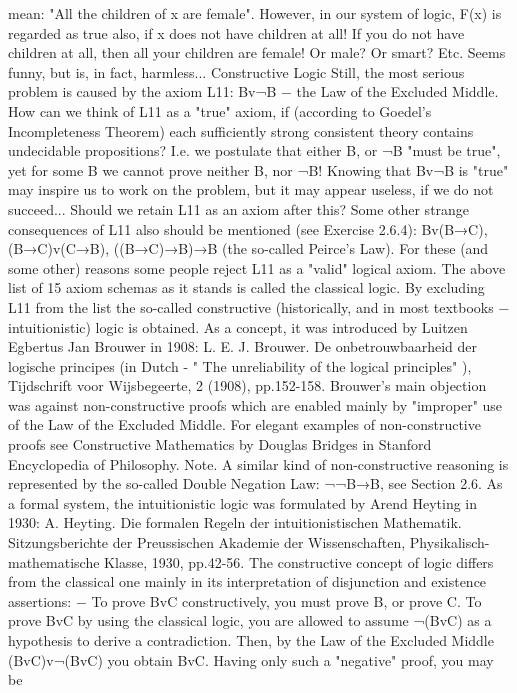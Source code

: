 mean: "All the children of x are female". However, in our system of logic, F(x) is regarded as true also, if
x does not have children at all! If you do not have children at all, then all your children are female! Or
male? Or smart? Etc. Seems funny, but is, in fact, harmless...
Constructive Logic
Still, the most serious problem is caused by the axiom L11: Bv¬B − the Law of the Excluded Middle.
How can we think of L11 as a "true" axiom, if (according to Goedel's Incompleteness Theorem) each
sufficiently strong consistent theory contains undecidable propositions? I.e. we postulate that either B, or
¬B "must be true", yet for some B we cannot prove neither B, nor ¬B! Knowing that Bv¬B is "true" may
inspire us to work on the problem, but it may appear useless, if we do not succeed... Should we retain L11
as an axiom after this?
Some other strange consequences of L11 also should be mentioned (see Exercise 2.6.4):
Bv(B→C),
(B→C)v(C→B),
((B→C)→B)→B (the so-called Peirce's Law).
For these (and some other) reasons some people reject L11 as a "valid" logical axiom.
The above list of 15 axiom schemas as it stands is called the classical logic.
By excluding L11 from the list the so-called constructive (historically, and in most textbooks −
intuitionistic) logic is obtained. As a concept, it was introduced by Luitzen Egbertus Jan Brouwer in
1908:
L. E. J. Brouwer. De onbetrouwbaarheid der logische principes (in Dutch - " The unreliability of the logical principles" ),
Tijdschrift voor Wijsbegeerte, 2 (1908), pp.152-158.
Brouwer's main objection was against non-constructive proofs which are enabled mainly by "improper"
use of the Law of the Excluded Middle.
For elegant examples of non-constructive proofs see Constructive Mathematics by Douglas Bridges in
Stanford Encyclopedia of Philosophy.
Note. A similar kind of non-constructive reasoning is represented by the so-called Double Negation Law:
¬¬B→B, see Section 2.6.
As a formal system, the intuitionistic logic was formulated by Arend Heyting in 1930:
A. Heyting. Die formalen Regeln der intuitionistischen Mathematik. Sitzungsberichte der Preussischen Akademie der
Wissenschaften, Physikalisch-mathematische Klasse, 1930, pp.42-56.
The constructive concept of logic differs from the classical one mainly in its interpretation of disjunction
and existence assertions:
− To prove BvC constructively, you must prove B, or prove C. To prove BvC by using the classical logic,
you are allowed to assume ¬(BvC) as a hypothesis to derive a contradiction. Then, by the Law of the
Excluded Middle (BvC)v¬(BvC) you obtain BvC. Having only such a "negative" proof, you may be

